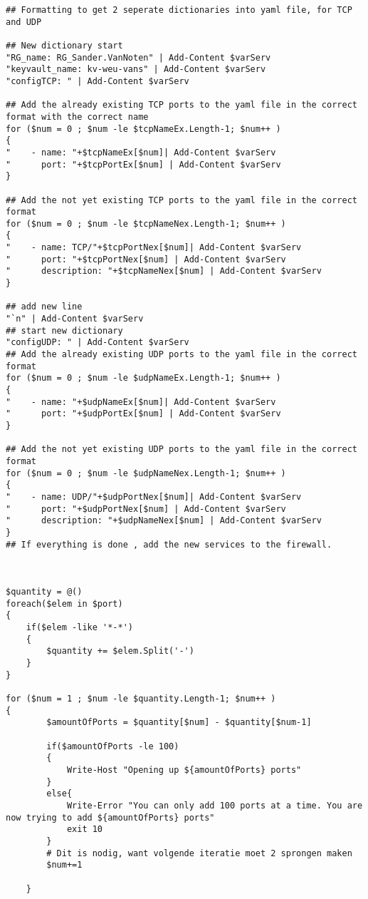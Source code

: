 \documentclass[dutch,dit,thesis]{hogentreport}
\begin{document}
\begin{lstlisting}[caption={main.ps1 Powershell script}]
## Formatting to get 2 seperate dictionaries into yaml file, for TCP and UDP

## New dictionary start
"RG_name: RG_Sander.VanNoten" | Add-Content $varServ
"keyvault_name: kv-weu-vans" | Add-Content $varServ
"configTCP: " | Add-Content $varServ

## Add the already existing TCP ports to the yaml file in the correct format with the correct name
for ($num = 0 ; $num -le $tcpNameEx.Length-1; $num++ )
{
"    - name: "+$tcpNameEx[$num]| Add-Content $varServ
"      port: "+$tcpPortEx[$num] | Add-Content $varServ
}

## Add the not yet existing TCP ports to the yaml file in the correct format
for ($num = 0 ; $num -le $tcpNameNex.Length-1; $num++ )
{
"    - name: TCP/"+$tcpPortNex[$num]| Add-Content $varServ
"      port: "+$tcpPortNex[$num] | Add-Content $varServ
"      description: "+$tcpNameNex[$num] | Add-Content $varServ
}

## add new line
"`n" | Add-Content $varServ
## start new dictionary
"configUDP: " | Add-Content $varServ
## Add the already existing UDP ports to the yaml file in the correct format
for ($num = 0 ; $num -le $udpNameEx.Length-1; $num++ )
{
"    - name: "+$udpNameEx[$num]| Add-Content $varServ
"      port: "+$udpPortEx[$num] | Add-Content $varServ
}

## Add the not yet existing UDP ports to the yaml file in the correct format
for ($num = 0 ; $num -le $udpNameNex.Length-1; $num++ )
{
"    - name: UDP/"+$udpPortNex[$num]| Add-Content $varServ
"      port: "+$udpPortNex[$num] | Add-Content $varServ
"      description: "+$udpNameNex[$num] | Add-Content $varServ
}
## If everything is done , add the new services to the firewall. 



$quantity = @()
foreach($elem in $port)
{
    if($elem -like '*-*')
    {
        $quantity += $elem.Split('-')
    }
}

for ($num = 1 ; $num -le $quantity.Length-1; $num++ )
{
        $amountOfPorts = $quantity[$num] - $quantity[$num-1]

        if($amountOfPorts -le 100)
        {
            Write-Host "Opening up ${amountOfPorts} ports"
        }
        else{
            Write-Error "You can only add 100 ports at a time. You are now trying to add ${amountOfPorts} ports"
            exit 10
        }
        # Dit is nodig, want volgende iteratie moet 2 sprongen maken
        $num+=1
        
    }


\end{lstlisting}
\end{document}
